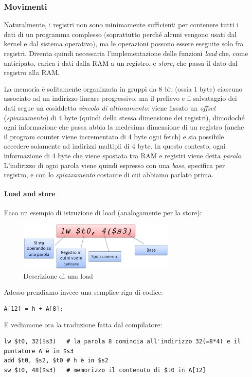 \documentclass[class=book, crop=false]{standalone}
\begin{document}
\subsubsection{Movimenti}
Naturalmente, i registri non sono minimamente sufficienti per contenere tutti i dati di un programma complesso (soprattutto perché alcuni vengono usati dal kernel e dal sistema operativo), ma le operazioni possono essere eseguite solo fra registri. Diventa quindi necessaria l'implementazione delle funzioni \emph{load} che, come anticipato, carica i dati dalla RAM a un registro, e \emph{store}, che passa il dato dal registro alla RAM.

La memoria è solitamente organizzata in gruppi da 8 bit (ossia 1 byte) ciascuno associato ad  un indirizzo lineare progressivo, ma il prelievo e il salvataggio dei dati segue un cosiddetto \emph{vincolo di allineamento}: viene fissato un \emph{offset} (\emph{spiazzamento}) di 4 byte (quindi della stessa dimensione dei registri), dimodoché ogni informazione che passa abbia la medesima dimensione di un registro (anche il program counter viene incrementato di 4 byte ogni fetch) e sia possibile accedere solamente ad indirizzi multipli di 4 byte. In questo contesto, ogni informazione di 4 byte che viene spostata tra RAM e registri viene detta \emph{parola}.\\
L'indirizzo di ogni parola viene quindi espresso con una \emph{base}, specifica per registro, e con lo \emph{spiazzamento} costante di cui abbiamo parlato prima.

\paragraph{Load and store}
Ecco un esempio di istruzione di load (analogamente per la store):
\begin{figure}[H]
	\centering
	\includegraphics[width=0.7\textwidth,keepaspectratio]{load}
	\caption{Descrizione di una load}
\end{figure}
Adesso prendiamo invece una semplice riga di codice:
\begin{verbatim}
A[12] = h + A[8];
\end{verbatim}
E vediamone ora la traduzione fatta dal compilatore:
\begin{verbatim}
lw $t0, 32($s3)   # la parola 8 comincia all'indirizzo 32(=8*4) e il puntatore A è in $s3
add $t0, $s2, $t0 # h è in $s2
sw $t0, 48($s3)   # memorizzo il contenuto di $t0 in A[12]
\end{verbatim}
\end{document}

